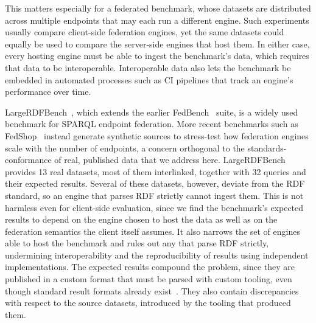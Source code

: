 This matters especially for a federated benchmark, whose datasets are distributed across multiple endpoints that may each run a different engine.
Such experiments usually compare client-side federation engines, yet the same datasets could equally be used to compare the server-side engines that host them.
In either case, every hosting engine must be able to ingest the benchmark's data, which requires that data to be interoperable.
Interoperable data also lets the benchmark be embedded in automated processes such as \ac{CI} pipelines that track an engine's performance over time.

LargeRDFBench~\cite{saleem2018largerdfbench}, which extends the earlier FedBench~\cite{schmidt2011fedbench} suite, is a widely used benchmark for SPARQL endpoint federation.
More recent benchmarks such as FedShop~\cite{dang2023fedshop} instead generate synthetic sources to stress-test how federation engines scale with the number of endpoints, a concern orthogonal to the standards-conformance of real, published data that we address here.
LargeRDFBench provides 13 real datasets, most of them interlinked, together with 32 queries and their expected results.
Several of these datasets, however, deviate from the \ac{RDF} standard, so an engine that parses \ac{RDF} strictly cannot ingest them.
This is not harmless even for client-side evaluation, since we find the benchmark's expected results to depend on the engine chosen to host the data as well as on the federation semantics the client itself assumes.
It also narrows the set of engines able to host the benchmark and rules out any that parse \ac{RDF} strictly, undermining interoperability and the reproducibility of results using independent implementations.
The expected results compound the problem, since they are published in a custom format that must be parsed with custom tooling, even though standard result formats already exist~\cite{sparql11resultsjson}.
They also contain discrepancies with respect to the source datasets, introduced by the tooling that produced them.

